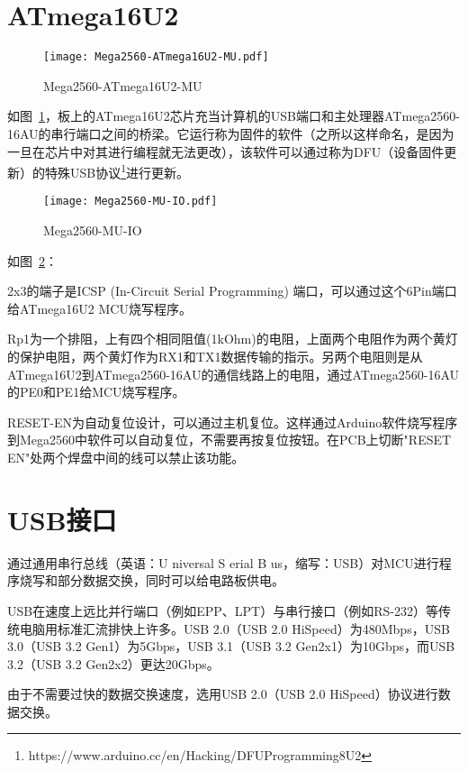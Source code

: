 \section{ATmega16U2}

\begin{figure}[htbp]
    \centering
    \texttt{[image: Mega2560-ATmega16U2-MU.pdf]}
    \caption{Mega2560-ATmega16U2-MU}
    \label{fig:Mega2560-ATmega16U2-MU}
\end{figure}

如图~\ref{fig:Mega2560-ATmega16U2-MU}，板上的ATmega16U2芯片充当计算机的USB端口和主处理器ATmega2560-16AU的串行端口之间的桥梁。它运行称为固件的软件（之所以这样命名，是因为一旦在芯片中对其进行编程就无法更改），该软件可以通过称为DFU（设备固件更新）的特殊USB协议\footnote{https://www.arduino.cc/en/Hacking/DFUProgramming8U2}进行更新。

\begin{figure}[htbp]
    \centering
    \texttt{[image: Mega2560-MU-IO.pdf]}
    \caption{Mega2560-MU-IO}
    \label{fig:Mega2560-MU-IO}
\end{figure}

如图~\ref{fig:Mega2560-MU-IO}：

2x3的端子是ICSP (In-Circuit Serial Programming) 端口，可以通过这个6Pin端口给ATmega16U2 MCU烧写程序。

Rp1为一个排阻，上有四个相同阻值(1kOhm)的电阻，上面两个电阻作为两个黄灯的保护电阻，两个黄灯作为RX1和TX1数据传输的指示。另两个电阻则是从ATmega16U2到ATmega2560-16AU的通信线路上的电阻，通过ATmega2560-16AU的PE0和PE1给MCU烧写程序。

RESET-EN为自动复位设计，可以通过主机复位。这样通过Arduino软件烧写程序到Mega2560中软件可以自动复位，不需要再按复位按钮。在PCB上切断"RESET EN"处两个焊盘中间的线可以禁止该功能。

\section{USB接口}

通过通用串行总线（英语：U niversal S erial B us，缩写：USB）对MCU进行程序烧写和部分数据交换，同时可以给电路板供电。

USB在速度上远比并行端口（例如EPP、LPT）与串行接口（例如RS-232）等传统电脑用标准汇流排快上许多。USB 2.0（USB 2.0 HiSpeed）为480Mbps，USB 3.0（USB 3.2 Gen1）为5Gbps，USB 3.1（USB 3.2 Gen2x1）为10Gbps，而USB 3.2（USB 3.2 Gen2x2）更达20Gbps。

由于不需要过快的数据交换速度，选用USB 2.0（USB 2.0 HiSpeed）协议进行数据交换。

